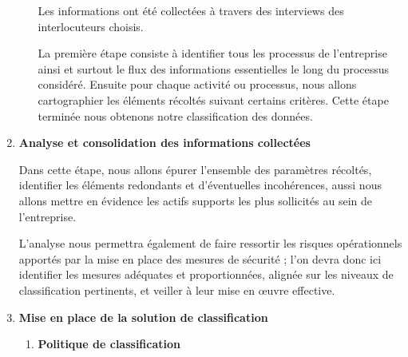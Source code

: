 \begin{enumerate}
\begin{enumerate}
       Les informations ont été collectées à travers des interviews des interlocuteurs choisis. 
       
        La première étape consiste à identifier tous les processus de l’entreprise ainsi et surtout le flux des informations essentielles le long du processus considéré. Ensuite pour chaque activité ou processus, nous allons cartographier les éléments récoltés suivant certains critères. Cette étape terminée nous obtenons notre classification des données.

   \end{enumerate}
   \item \textbf{Analyse et consolidation des informations collectées}
   
   Dans cette étape, nous allons épurer l’ensemble des paramètres récoltés, identifier les éléments redondants et d’éventuelles incohérences, aussi nous allons mettre en évidence les actifs supports les plus sollicités au sein de l’entreprise.
   
L’analyse nous permettra également de faire ressortir les risques opérationnels apportés par la mise en place des mesures de sécurité ; l’on devra donc ici identifier les mesures adéquates et proportionnées, alignée sur les niveaux de classification pertinents, et veiller à leur mise en œuvre effective.

   \item \textbf{Mise en place de la solution de classification}
   \begin{enumerate}
       \item \textbf{Politique de classification}
       

\end{enumerate}
\end{enumerate}
